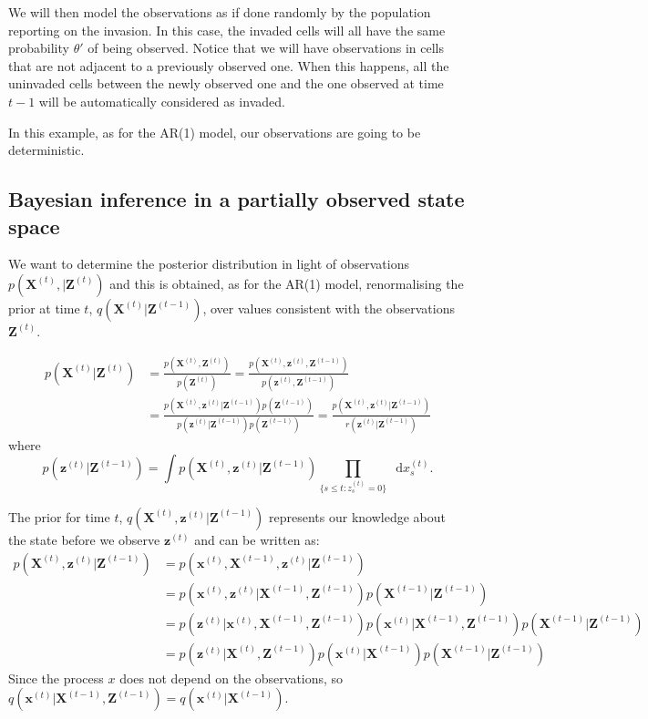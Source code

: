\documentclass[11pt,a4paper]{article}
\renewcommand{\vec}[1]{\mathbf{#1}}
\newcommand*\diff{\mathop{}\!\mathrm{d}}
\begin{document}
We will then model the observations as if done randomly by the population reporting on the invasion. In this case, the invaded cells will all have the same probability $\theta'$ of being observed. Notice that we will have observations in cells that are not adjacent to a previously observed one. When this happens, all the uninvaded cells between the newly observed one and the one observed at time $t-1$ will be automatically considered as invaded.

In this example, as for the AR(1) model, our observations are going to be deterministic.


\subsection{Bayesian inference in a partially observed state space}
We want to determine the posterior distribution in light of observations $p(\vec{X}^{(t)}, | \vec{Z}^{(t)})$ and this is obtained, as for the AR(1) model, renormalising the prior at time $t$, $q(\vec{X}^{(t)} | \vec{Z}^{(t-1)})$, over values consistent with the observations $\vec{Z}^{(t)}$.

\begin{align*}
    p(\vec{X}^{(t)} | \vec{Z}^{(t)})  & =  \frac{p(\vec{X}^{(t)}, \vec{Z}^{(t)})}{p(\vec{Z}^{(t)})} = \frac{ p(\vec{X}^{(t)}, \vec{z}^{(t)}, \vec{Z}^{(t-1)})} {p(\vec{z}^{(t)}, \vec{Z}^{(t-1)})}\\ 
    & = \frac{ p(\vec{X}^{(t)}, \vec{z}^{(t)} | \vec{Z}^{(t-1)}) p(\vec{Z}^{(t-1)})} {p(\vec{z}^{(t)} | \vec{Z}^{(t-1)}) p(\vec{Z}^{(t-1)})} =
    \frac{ p(\vec{X}^{(t)}, \vec{z}^{(t)} | \vec{Z}^{(t-1)})} {r(\vec{z}^{(t)} | \vec{Z}^{(t-1)})}
\end{align*}
where 
\[
    p(\vec{z}^{(t)} | \vec{Z}^{(t-1)}) = \int p(\vec{X}^{(t)}, \vec{z}^{(t)}|\vec{Z}^{(t-1)}) \prod_{\{s \leq t: z_s^{(t)} = 0\}} \diff x_s^{(t)}.
\]


The prior for time $t$, $q(\vec{X}^{(t)},\vec{z}^{(t)} | \vec{Z}^{(t-1)})$ represents our knowledge about the state before we observe $\vec{z}^{(t)}$ and can be written as:
\begin{align*}
    p(\vec{X}^{(t)},\vec{z}^{(t)} | \vec{Z}^{(t-1)}) & = p(\vec{x}^{(t)}, \vec{X}^{(t-1)}, \vec{z}^{(t)} | \vec{Z}^{(t-1)})\\
    & = p(\vec{x}^{(t)},\vec{z}^{(t)} | \vec{X}^{(t-1)}, \vec{Z}^{(t-1)})     p(\vec{X}^{(t-1)} | \vec{Z}^{(t-1)})\\
    & = p(\vec{z}^{(t)} | \vec{x}^{(t)}, \vec{X}^{(t-1)}, \vec{Z}^{(t-1)}) p(\vec{x}^{(t)} | \vec{X}^{(t-1)}, \vec{Z}^{(t-1)}) p(\vec{X}^{(t-1)} | \vec{Z}^{(t-1)})\\
    & = p(\vec{z}^{(t)} | \vec{X}^{(t)}, \vec{Z}^{(t-1)}) p(\vec{x}^{(t)} | \vec{X}^{(t-1)}) p(\vec{X}^{(t-1)} | \vec{Z}^{(t-1)})
\end{align*}
Since the process $x$ does not depend on the observations, so $q(\vec{x}^{(t)} | \vec{X}^{(t-1)}, \vec{Z}^{(t-1)}) = q(\vec{x}^{(t)} | \vec{X}^{(t-1)})$.
\end{document}
